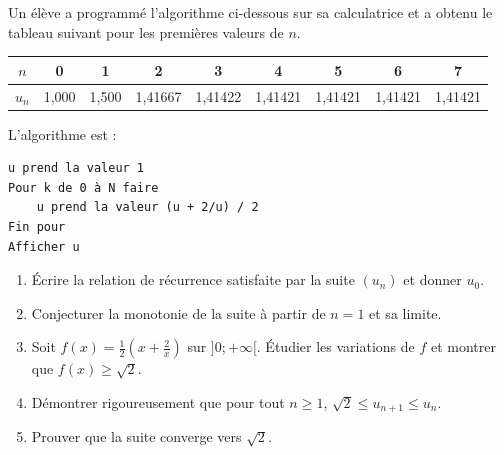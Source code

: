 \documentclass[11pt]{article}
\begin{document}
\begin{exercice}
Un élève a programmé l'algorithme ci-dessous sur sa calculatrice et a obtenu le tableau suivant pour les premières valeurs de $n$.

\begin{center}
\begin{tabular}{|c|c|c|c|c|c|c|c|c|}
\hline
$n$ & 0 & 1 & 2 & 3 & 4 & 5 & 6 & 7 \\
\hline
$u_n$ & 1,000 & 1,500 & 1,41667 & 1,41422 & 1,41421 & 1,41421 & 1,41421 & 1,41421 \\
\hline
\end{tabular}
\end{center}

\noindent L'algorithme est :
\begin{verbatim}
u prend la valeur 1
Pour k de 0 à N faire
    u prend la valeur (u + 2/u) / 2
Fin pour
Afficher u
\end{verbatim}

\begin{enumerate}
    \item Écrire la relation de récurrence satisfaite par la suite $(u_n)$ et donner $u_0$.
    \item Conjecturer la monotonie de la suite à partir de $n=1$ et sa limite.
    \item Soit $f(x) = \frac{1}{2}(x + \frac{2}{x})$ sur $]0; +\infty[$. Étudier les variations de $f$ et montrer que $f(x) \geqslant \sqrt{2}$.
    \item Démontrer rigoureusement que pour tout $n \geqslant 1$, $\sqrt{2} \leqslant u_{n+1} \leqslant u_n$.
    \item Prouver que la suite converge vers $\sqrt{2}$.
\end{enumerate}
\end{exercice}
\end{document}

